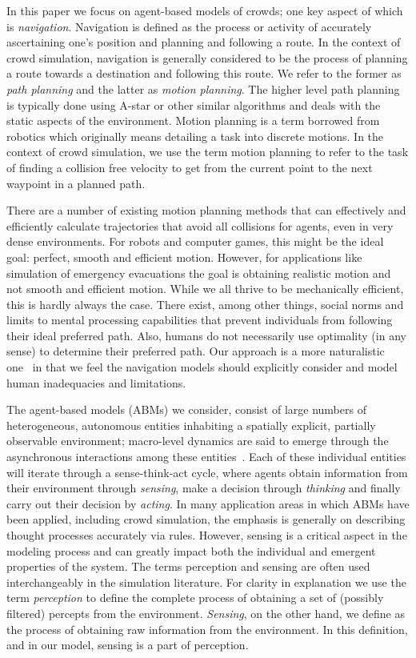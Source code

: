 \documentclass[runningheads,a4paper]{llncs}
\begin{document}
In this paper we focus on agent-based models of crowds; one key aspect of which is \emph{navigation}. Navigation is defined as the process or activity of accurately ascertaining one's position and planning and following a route. In the context of crowd simulation, navigation is generally considered to be the process of planning a route towards a destination and following this route. We refer to the former as \emph{path planning} and the latter as \emph{motion planning}. The higher level path planning is typically done using A-star or other similar algorithms and deals with the static aspects of the environment. Motion planning is a term borrowed from robotics which originally means detailing a task into discrete motions. In the context of crowd simulation, we use the term motion planning to refer to the task of finding a collision free velocity to get from the current point to the next waypoint in a planned path.

There are a number of existing motion planning methods that can effectively and efficiently calculate trajectories that avoid all collisions for agents, even in very dense environments. For robots and computer games, this might be the ideal goal: perfect, smooth and efficient motion. However, for applications like simulation of emergency evacuations the goal is obtaining realistic motion and not smooth and efficient motion. While we all thrive to be mechanically efficient, this is hardly always the case. There exist, among other things, social norms and limits to mental processing capabilities that prevent individuals from following their ideal preferred path. Also, humans do not necessarily use optimality (in any sense) to determine their preferred path. Our approach is a more naturalistic one~\cite{Klein:2009} in that we feel the navigation models should explicitly consider and model human inadequacies and limitations.

The agent-based models (ABMs) we consider, consist of large numbers of heterogeneous, autonomous entities inhabiting a spatially explicit, partially observable environment; macro-level dynamics are said to emerge through the asynchronous interactions among these entities~\cite{Bonabeau:2002um,Epstein:1999vn}. Each of these individual entities will iterate through a sense-think-act cycle, where agents obtain information from their environment through {\em sensing}, make a decision through {\em thinking} and finally carry out their decision by {\em acting}. In many application areas in which ABMs have been applied, including crowd simulation, the emphasis is generally on describing thought processes accurately via rules. However, sensing is a critical aspect in the modeling process and can greatly impact both the individual and emergent properties of the system. The terms perception and sensing are often used interchangeably in the simulation literature. For clarity in explanation we use the term {\em perception} to define the complete process of obtaining a set of (possibly filtered) percepts from the environment. {\em Sensing}, on the other hand, we define as the process of obtaining raw information from the environment. In this definition, and in our model, sensing is a part of perception. 
\end{document}
